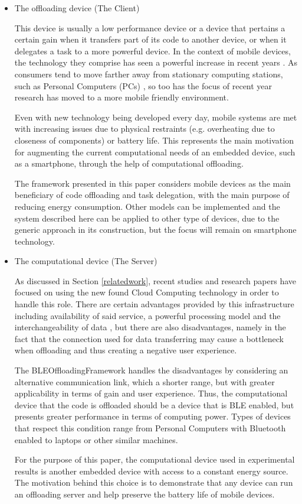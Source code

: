 \begin{itemize}

\item{The offloading device (The Client)}

	This device is usually a low performance device or a device that pertains a certain gain when it transfers part of its code to another device, or when it delegates a task to a more powerful device. In the context of mobile devices, the technology they comprise has seen a powerful increase in recent years \cite{abolfazli2012mobile}. As consumers tend to move farther away from stationary computing stations, such as Personal Computers (PCs)  \cite{gartnerforecast}, so too has the focus of recent year research has moved to a more mobile friendly environment. 
	
	Even with new technology being developed every day, mobile systems are met with increasing issues due to physical restraints (e.g. overheating due to closeness of components) or battery life. This represents the main motivation for augmenting the current computational needs of an embedded device, such as a smartphone, through the help of computational offloading.
	
	The framework presented in this paper considers mobile devices as the main beneficiary of code offloading and task delegation, with the main purpose of reducing energy consumption. Other models can be implemented and the system described here can be applied to other type of devices, due to the generic approach in its construction, but the focus will remain on smartphone technology.

\item{The computational device (The Server)}

	As discussed in Section \ref{relatedwork}, recent studies and research papers have focused on using the new found Cloud Computing technology in order to handle this role. There are certain advantages provided by this infrastructure including availability of said service, a powerful processing model and the interchangeability of data \cite{kumar2010cloud}, but there are also disadvantages, namely in the fact that the connection used for data transferring may cause a bottleneck when offloading and thus creating a negative user experience.
	
	The BLEOffloadingFramework handles the disadvantages by considering an alternative communication link, which a shorter range, but with greater applicability in terms of gain and user experience. Thus, the computational device that the code is offloaded should be a device that is BLE enabled, but presents greater performance in terms of computing power. Types of devices that respect this condition range from Personal Computers with Bluetooth enabled to laptops or other similar machines.
	
	For the purpose of this paper, the computational device used in experimental results is another embedded device with access to a constant energy source. The motivation behind this choice is to demonstrate that any device can run an offloading server and help preserve the battery life of mobile devices.

\end{itemize}



